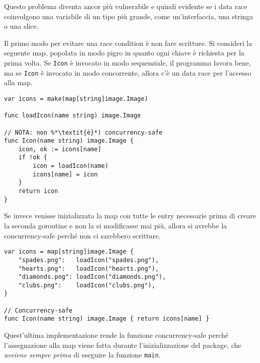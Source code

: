 \documentclass[../../thesis.tex]{subfiles}
\begin{document}
    Questo problema diventa ancor più vulnerabile e quindi evidente se i data race coinvolgono una variabile di un tipo più grande, come un'interfaccia, una stringa o una slice.
    \hfill \vspace{12pt}

    Il primo modo per evitare una race condition è non fare scritture.
    Si consideri la seguente map, popolata in modo pigro in quanto ogni chiave è richiesta per la prima volta.
    Se \verb"Icon" è invocato in modo sequenziale, il programma lavora bene, ma se \verb"Icon" è invocato in modo concorrente, allora c'è un data race per l'accesso alla map.
    \begin{lstlisting}[frame = single, label = {lst:lstlisting9-1.4}]
var icons = make(map[string]image.Image)

func loadIcon(name string) image.Image

// NOTA: non %*\textit{è}*) concurrency-safe
func Icon(name string) image.Image {
    icon, ok := icons[name]
    if !ok {
        icon = loadIcon(name)
        icons[name] = icon
    }
    return icon
}
    \end{lstlisting}
    Se invece venisse inizializzata la map con tutte le entry necessarie prima di creare la seconda goroutine e non la si modificasse mai più, allora si avrebbe la concurrency-safe perché non ci sarebbero scritture.
    \clearpage
    \newpage
    \begin{lstlisting}[frame = single, label = {lst:lstlisting9-1.5}]
var icons = map[string]image.Image {
    "spades.png":   loadIcon("spades.png"),
    "hearts.png":   loadIcon("hearts.png"),
    "diamonds.png": loadIcon("diamonds.png"),
    "clubs.png":    loadIcon("clubs.png"),
}

// Concurrency-safe
func Icon(name string) image.Image { return icons[name] }
    \end{lstlisting}
    Quest'ultima implementazione rende la funzione concurrency-safe perché l'assegnazione alla map viene fatta durante l'inizializzazione del package, che \textit{avviene sempre prima} di eseguire la funzione \verb"main".
    \hfill \vspace{12pt}
\end{document}
